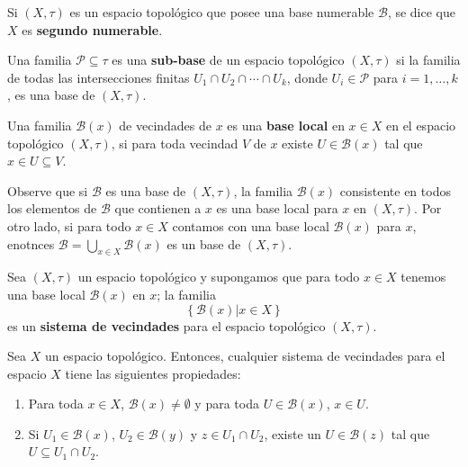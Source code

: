 \documentclass[12pt]{report}
\theoremstyle{largebreak}
\newcommand{\eul}[1]{\ensuremath{\mathscr{#1}}}
\renewcommand{\theenumi}{\arabic{enumi})}
\begin{document}
    \begin{mydef}
        Si $(X,\tau)$ es un espacio topológico que posee una base numerable $\eul{B}$, se dice que $X$ es \textbf{segundo numerable}.
    \end{mydef}

    Una familia $\eul{P}\subseteq\tau$ es una \textbf{sub-base} de un espacio topológico $(X,\tau)$ si la familia de todas las intersecciones finitas $U_1\cap U_2\cap\cdots\cap U_k$, donde $U_i\in\eul{P}$ para $i=1,\dots,k$, es una base de $(X,\tau)$.\

    \begin{mydef}
        Una familia $\eul{B}(x)$ de vecindades de $x$ es una \textbf{base local} en $x\in X$ en el espacio topológico $(X,\tau)$, si para toda vecindad $V$ de $x$ existe $U\in\eul{B}(x)$ tal que $x\in U\subseteq V$.
    \end{mydef}

    Observe que si $\eul{B}$ es una base de $(X,\tau)$, la familia $\eul{B}(x)$ consistente en todos los elementos de $\eul{B}$ que contienen a $x$ es una base local para $x$ en $(X,\tau)$. Por otro lado, si para todo $x\in X$ contamos con una base local $\eul{B}(x)$ para $x$, enotnces $\eul{B}=\bigcup_{x\in X}\eul{B}(x)$ es un base de $(X,\tau)$.

    \begin{mydef}
        Sea $(X,\tau)$ un espacio topológico y supongamos que para todo $x\in X$ tenemos una base local $\eul{B}(x)$ en $x$; la familia
        \begin{equation*}
            \left\{\eul{B}(x) \big| x\in X \right\}
        \end{equation*}
        es un \textbf{sistema de vecindades} para el espacio topológico $(X,\tau)$.
    \end{mydef}

    \begin{propo}
        Sea $X$ un espacio topológico. Entonces, cualquier sistema de vecindades para el espacio $X$ tiene las siguientes propiedades:
        \renewcommand{\theenumi}{BP\arabic{enumi})}
        \begin{enumerate}
            \item Para toda $x\in X$, $\eul{B}(x)\neq\emptyset$ y para toda $U\in\eul{B}(x)$, $x\in U$.
            \item Si $U_1\in\eul{B}(x)$, $U_2\in\eul{B}(y)$ y $z\in U_1\cap U_2$, existe un $U\in \eul{B}(z)$ tal que $U\subseteq U_1\cap U_2$.
        \end{enumerate}
        \renewcommand{\theenumi}{B\arabic{enumi})}
    \end{propo}
\end{document}
